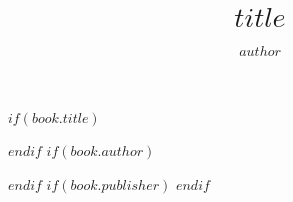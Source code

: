 

$if(book.title)$
\title[$book.title-short$]{$title$} 
$endif$
$if(book.author)$
\author{$author$} 
$endif$
$if(book.publisher)$
$endif$





